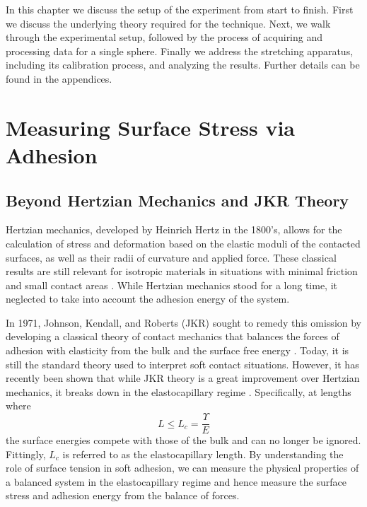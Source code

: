 In this chapter we discuss the setup of the experiment from start to finish. First we discuss the underlying theory required for the technique. Next, we walk through the experimental setup, followed by the process of acquiring and processing data for a single sphere. Finally we address the stretching apparatus, including its calibration process, and analyzing the results. Further details can be found in the appendices.

\section{Measuring Surface Stress via Adhesion}
\subsection{Beyond Hertzian Mechanics and JKR Theory}

Hertzian mechanics, developed by Heinrich Hertz in the 1800's, allows for the calculation of stress and deformation based on the elastic moduli of the contacted surfaces, as well as their radii of curvature and applied force. These classical results are still relevant for isotropic materials in situations with minimal friction and small contact areas \cite{JohnsonHertzBOOK}. While Hertzian mechanics stood for a long time, it neglected to take into account the adhesion energy of the system.  

In 1971, Johnson, Kendall, and Roberts (JKR) sought to remedy this omission by developing a classical theory of contact mechanics that balances the forces of adhesion with elasticity from the bulk and the surface free energy {\cite{johnson1971surface}}. Today, it is still the standard theory used to interpret soft contact situations. However, it has recently been shown that while JKR theory is a great improvement over Hertzian mechanics, it breaks down in the elastocapillary regime \cite{style2013surface}. Specifically, at lengths where 
\begin{equation}
\label{EC_regime}
L \leq L_{c} = \frac{\Upsilon}{E}
\end{equation}
the surface energies compete with those of the bulk and can no longer be ignored. Fittingly, $L_c$ is referred to as the elastocapillary length. By understanding the role of surface tension in soft adhesion, we can measure the physical properties of a balanced system in the elastocapillary regime and hence measure the surface stress and adhesion energy from the balance of forces.



